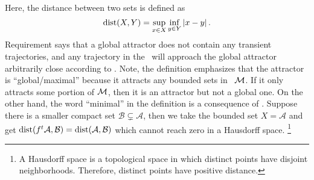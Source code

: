 Here, the distance between two sets is defined as
\begin{equation}
  \label{eq:dist}
  \operatorname{dist}(X, Y) = \sup_{x\in X} \inf_{y\in Y} |x - y|
  \,.
\end{equation}
Requirement  says that
a global attractor does not contain any transient trajectories,
and any trajectory in the \statesp\ will approach the
global attractor arbitrarily close according to .
Note,
the definition emphasizes that the attractor is ``global/maximal'' because
it attracts any bounded sets in \statesp\ $\mathcal{M}$. If it only attracts some
portion of $\mathcal{M}$, then it is an
attractor but not a global one. On the other hand,
the word ``minimal'' in the definition
is a consequence of . Suppose there is a
smaller compact set $\mathcal{B}\subsetneq \mathcal{A}$, then
we take the bounded set $X = \mathcal{A}$ and get
$\operatorname{dist}({f^{t}}\mathcal{A}, \mathcal{B}) = \operatorname{dist}(\mathcal{A}, \mathcal{B})$
which cannot reach zero in a Hausdorff space.
\footnote{
  A Hausdorff space is a topological space in which distinct points
  have disjoint neighborhoods. Therefore, distinct points have
  positive distance.
}

